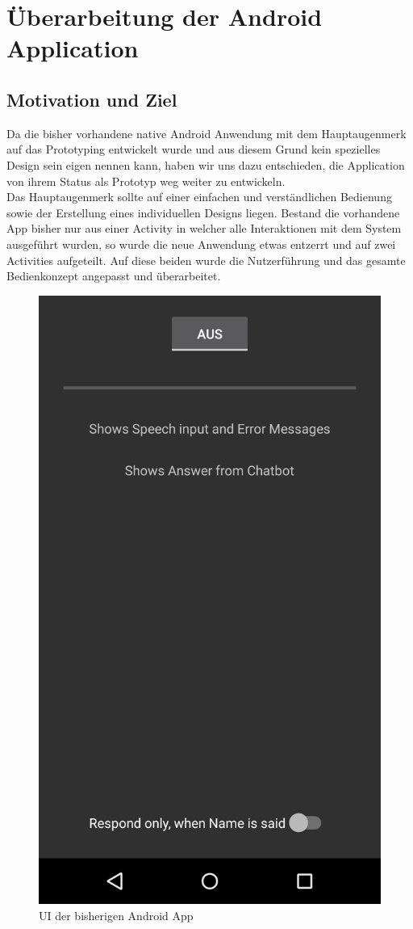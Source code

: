 \section{Überarbeitung der Android Application}

	\subsection{Motivation und Ziel}\label{motiv}
	Da die bisher vorhandene native Android Anwendung mit dem Hauptaugenmerk auf das Prototyping entwickelt wurde und aus diesem Grund kein spezielles Design sein eigen nennen kann, haben wir uns dazu entschieden, die Application von ihrem Status als Prototyp weg weiter zu entwickeln.\\

	Das Hauptaugenmerk sollte auf einer einfachen und verständlichen Bedienung sowie der Erstellung eines individuellen Designs liegen. Bestand die vorhandene App bisher nur aus einer Activity in welcher alle Interaktionen mit dem System ausgeführt wurden, so wurde die neue Anwendung etwas entzerrt und auf zwei Activities aufgeteilt. Auf diese beiden wurde die Nutzerführung und das gesamte Bedienkonzept angepasst und überarbeitet.\\

	\begin{figure}[htbp]
		\centering
		\includegraphics[height=0.8\textwidth]{dh/graphics/hablame-old.png}
		\caption{UI der bisherigen Android App}
		\label{fig:hablame-old}
	\end{figure} \leavevmode \\

